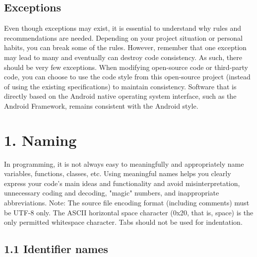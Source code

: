 \begin{center}
\subsection*{\textbf{Exceptions}}
Even though exceptions may exist, it is essential to understand why rules and recommendations are needed.
Depending on your project situation or personal habits, you can break some of the rules. However, remember that one exception may lead to many and eventually can destroy code consistency. As such, there should be very few exceptions.
When modifying open-source code or third-party code, you can choose to use the code style from this open-source project (instead of using the existing specifications) to maintain consistency.
Software that is directly based on the Android native operating system interface, such as the Android Framework, remains consistent with the Android style.
\section*{\textbf{1. Naming}}
In programming, it is not always easy to meaningfully and appropriately name variables, functions, classes, etc. Using meaningful names helps you clearly express your code's main ideas and functionality and avoid misinterpretation, unnecessary coding and decoding, "magic" numbers, and inappropriate abbreviations.
Note: The source file encoding format (including comments) must be UTF-8 only. The ASCII horizontal space character (0x20, that is, space) is the only permitted whitespace character. Tabs should not be used for indentation.
\subsection*{\textbf{1.1 Identifier names}}

\end{center}
